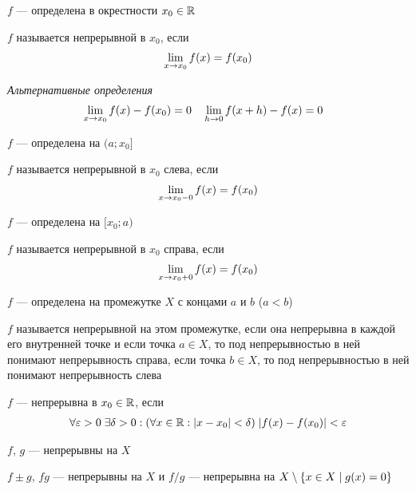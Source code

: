 \documentclass{article}
\begin{document}


$f$ ---  определена в окрестности $x_0\in\mathbb{R}$

$f$ называется непрерывной в $x_0$, если
\begin{align*}
	\lim\limits_{x \to x_0}f(x)=f(x_0)
\end{align*}

{\it Альтернативные определения}
\begin{align*}
	 & \lim\limits_{x\to x_0}f(x)-f(x_0)=0 &  & \lim\limits_{h\to 0}f(x+h)-f(x)=0
\end{align*}


$f$ ---  определена на $(a;x_0]$

$f$ называется непрерывной в $x_0$ слева, если
\begin{align*}
	\lim\limits_{x\to x_0-0}f(x)=f(x_0)
\end{align*}

$f$ --- определена на $[x_0;a)$

$f$ называется непрерывной в $x_0$ справа, если
\begin{align*}
	\lim\limits_{x\to x_0+0}f(x)=f(x_0)
\end{align*}


$f$ --- определена на промежутке $X$ с концами $a$ и $b$ ($a<b$)

$f$ называется непрерывной на этом промежутке, если она непрерывна в каждой его внутренней точке и
если точка $a \in X$, то под непрерывностью в ней понимают непрерывность справа,
если точка $b \in X$, то под непрерывностью в ней понимают непрерывность слева


$f$ --- непрерывна в $x_0\in\mathbb{R}$, если
\begin{align*}
	\forall\varepsilon>0\;\exists\delta>0:(\forall x\in\mathbb{R}:|x-x_0|<\delta)\;|f(x)-f(x_0)|<\varepsilon
\end{align*}

\theorem

$f$, $g$ --- непрерывны на $X$

$f\pm g$, $fg$ --- непрерывны на $X$ и $f/g$ --- непрерывна на $X\setminus\{x\in X\;|\;g(x)=0\}$
\end{document}
